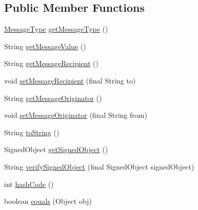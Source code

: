 \subsection*{Public Member Functions}
\begin{DoxyCompactItemize}
\item 
\hyperlink{enumgov_1_1fnal_1_1ppd_1_1ZZattic_1_1MessageType}{Message\-Type} \hyperlink{classgov_1_1fnal_1_1ppd_1_1ZZattic_1_1MessageCarrier_a2815136c8454ff691761c23dac942d23}{get\-Message\-Type} ()
\item 
String \hyperlink{classgov_1_1fnal_1_1ppd_1_1ZZattic_1_1MessageCarrier_af81213bb578f70befcd2392ddf083628}{get\-Message\-Value} ()
\item 
String \hyperlink{classgov_1_1fnal_1_1ppd_1_1ZZattic_1_1MessageCarrier_a3b36f242dd877bcd0d7addff3328566a}{get\-Message\-Recipient} ()
\item 
void \hyperlink{classgov_1_1fnal_1_1ppd_1_1ZZattic_1_1MessageCarrier_a63f5a9d0dda64711b4abab44fc459e28}{set\-Message\-Recipient} (final String to)
\item 
String \hyperlink{classgov_1_1fnal_1_1ppd_1_1ZZattic_1_1MessageCarrier_a9041fb2440cfeb821c3143ddc641892e}{get\-Message\-Originator} ()
\item 
void \hyperlink{classgov_1_1fnal_1_1ppd_1_1ZZattic_1_1MessageCarrier_aabc6ee957150d1935f78294d443d3205}{set\-Message\-Originator} (final String from)
\item 
String \hyperlink{classgov_1_1fnal_1_1ppd_1_1ZZattic_1_1MessageCarrier_af2efc53e04503aa52cf35c76733da79f}{to\-String} ()
\item 
Signed\-Object \hyperlink{classgov_1_1fnal_1_1ppd_1_1ZZattic_1_1MessageCarrier_a75bcc6f6e84614494d9121e858f2b48e}{get\-Signed\-Object} ()
\item 
String \hyperlink{classgov_1_1fnal_1_1ppd_1_1ZZattic_1_1MessageCarrier_afdb0e1272d9c3f27065bddc9d520087e}{verify\-Signed\-Object} (final Signed\-Object signed\-Object)
\item 
int \hyperlink{classgov_1_1fnal_1_1ppd_1_1ZZattic_1_1MessageCarrier_a9184009b9338ac902a60a6bde4774bd1}{hash\-Code} ()
\item 
boolean \hyperlink{classgov_1_1fnal_1_1ppd_1_1ZZattic_1_1MessageCarrier_a7cd6ea7fb22a369f3a2af0090f70dfad}{equals} (Object obj)
\end{DoxyCompactItemize}
